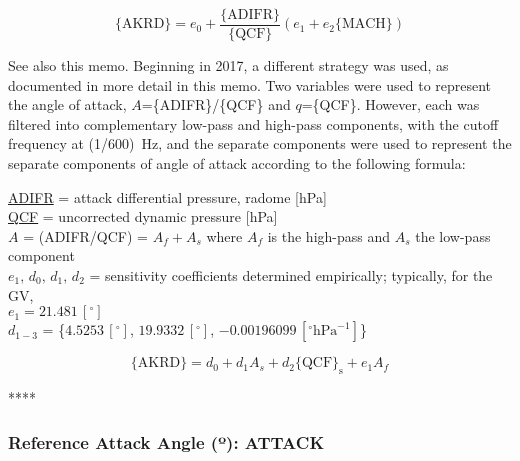 \documentclass[
]{book}
\begin{document}
\begin{equation}
\mathrm{\{AKRD\}}=e_{0}+\frac{\{\mathrm{ADIFR}\}}{\{\mathrm{QCF}\}}\left(e_{1}+e{}_{2}\mathrm{\{MACH\}}\right)
\label{eq:AKRD}
\end{equation}

See also this memo.
Beginning in 2017, a different strategy was used, as documented in more detail in this memo. Two variables were used to represent the angle of attack, \(A\)=\{ADIFR\}/\{QCF\} and \(q\)=\{QCF\}. However, each was filtered into complementary low-pass and high-pass components, with the cutoff frequency at (1/600)~Hz, and the separate components were used to represent the separate components of angle of attack according to the following formula:

\protect\hyperlink{adifr}{ADIFR} = attack differential pressure, radome {[}hPa{]}\\
\protect\hyperlink{qcx}{QCF} = uncorrected dynamic pressure {[}hPa{]}\\
\(A\) = (ADIFR/QCF) = \(A_{f}+A_{s}\) where \(A_{f}\) is the high-pass
and \(A_{s}\) the low-pass component\\
\(e_{1},\,d_{0},\,d{}_{1},\,d_{2}\) = sensitivity
coefficients determined empirically; typically, for the GV,\\
\hspace*{0.333em}\hspace*{0.333em}\hspace*{0.333em}\hspace*{0.333em}\hspace*{0.333em}\(e_{1}=21.481\,[^{\circ}]\)\\
\hspace*{0.333em}\hspace*{0.333em}\hspace*{0.333em}\hspace*{0.333em}\hspace*{0.333em}\(d_{1-3}\) = \{\(4.5253\,[^{\circ}]\), \(19.9332\,[^{\circ}]\), \(-0.00196099\,[^{\circ}\mathrm{hPa}^{-1}]\)\}

\begin{equation}
\mathrm{\{AKRD\}}=d_{0}+d_{1}A_{s}+d_{2}\mathrm{\{QCF\}_{s}+}e_{1}A_{f}
\label{eq:newAKRD}
\end{equation}

****

\hypertarget{attack}{%
\subsubsection*{\texorpdfstring{Reference Attack Angle ({º}): ATTACK}{Reference Attack Angle (º): ATTACK}}\label{attack}}
\end{document}
